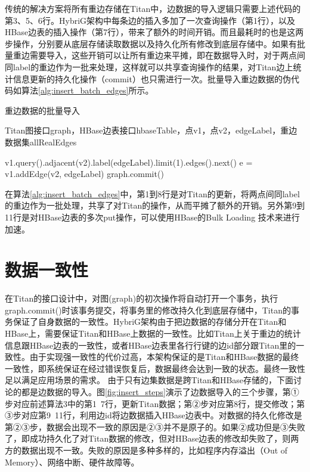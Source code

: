 传统的解决方案将所有重边存储在Titan中，边数据的导入逻辑只需要上述代码的第3、5、6行。HybriG架构中每条边的插入多加了一次查询操作（第1行），以及HBase边表的插入操作（第7行），带来了额外的时间开销。而且最耗时的也是这两步操作，分别要从底层存储读取数据以及持久化所有修改到底层存储中。如果有批量重边需要导入，这些开销可以让所有重边来平摊，即在数据导入时，对于两点间同label的重边作为一批来处理，这样就可以共享查询操作的结果，对Titan边上统计信息更新的持久化操作（commit）也只需进行一次。批量导入重边数据的伪代码如算法\ref{alg:insert_batch_edges}所示。
\begin{algorithm}
\caption{重边数据的批量导入}
\label{alg:insert_batch_edges}
\begin{algorithmic}[1] %
\REQUIRE Titan图接口graph，HBase边表接口hbaseTable，点v1，点v2，edgeLabel，重边数据集allRealEdges

\STATE v1.query().adjacent(v2).label(edgeLabel).limit(1).edges().next()
\STATE e = v1.addEdge(v2, edgeLabel)
\ENDIF
{}
\ENDFOR
\STATE graph.commit()
\ENDFOR
\end{algorithmic}
\end{algorithm}

在算法\ref{alg:insert_batch_edges}中，第1到8行是对Titan的更新，将两点间同label的重边作为一批处理，共享了对Titan的操作，从而平摊了额外的开销。另外第9到11行是对HBase边表的多次put操作，可以使用HBase的Bulk Loading 技术来进行加速。

\section{数据一致性}
在Titan的接口设计中，对图(graph)的初次操作将自动打开一个事务，执行graph.commit()时该事务提交，将事务里的修改持久化到底层存储中，Titan的事务保证了自身数据的一致性。HybriG架构由于把边数据的存储分开在Titan和HBase上，需要保证Titan和HBase上数据的一致性。比如Titan上关于重边的统计信息跟HBase边表的一致性，或者HBase边表里各行行键的边id部分跟Titan里的一致性。由于实现强一致性的代价过高，本架构保证的是Titan和HBase数据的最终一致性\supercite{eventually_consistent}，即系统保证在经过错误恢复后，数据最终会达到一致的状态。最终一致性足以满足应用场景的需求。
由于只有边集数据是跨Titan和HBase存储的，下面讨论的都是边数据的导入。图\ref{fig:insert_steps}演示了边数据导入的三个步骤，第①步对应前述算法3中的第1~7行，更新Titan数据；第②步对应第8行，提交修改；第③步对应第9~11行，利用边id将边数据插入HBase边表中。对数据的持久化修改是第②③步，数据会出现不一致的原因是②③并不是原子的。如果②成功但是③失败了，即成功持久化了对Titan数据的修改，但对HBase边表的修改却失败了，则两方的数据出现不一致。失败的原因是多种多样的，比如程序内存溢出（Out of Memory）、网络中断、硬件故障等。

